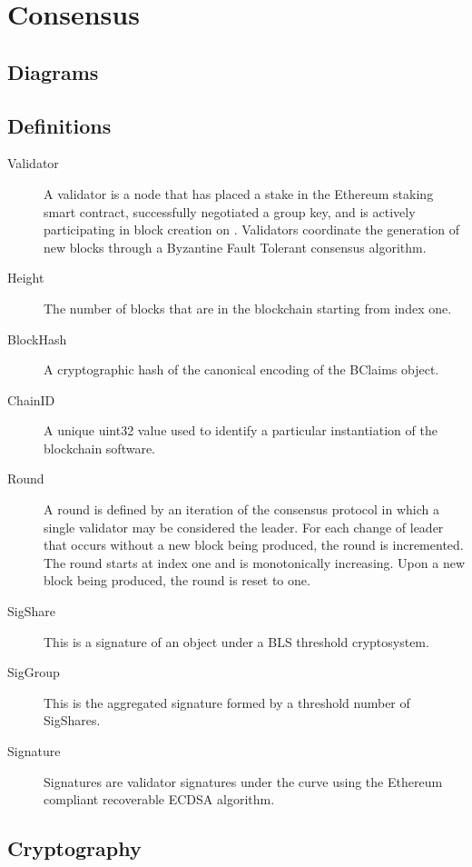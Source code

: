 \section{Consensus}

\subsection{Diagrams}



\subsection{Definitions}

\begin{description}
\item [Validator] A validator is a node that has placed a stake in the
    Ethereum staking smart contract, successfully negotiated a group key,
    and is actively participating in block creation on \LayerTwo{}.
    Validators coordinate the generation of new blocks through a
    Byzantine Fault Tolerant consensus algorithm.
\item [Height]
    The number of blocks that are in the blockchain starting from index one.
\item [BlockHash] A cryptographic hash of the canonical encoding
    of the BClaims object.
\item [ChainID] A unique uint32 value used to identify a particular
    instantiation of the \LayerTwo{} blockchain software.
\item [Round] A round is defined by an iteration of the consensus
    protocol in which a single validator may be considered the leader.
    For each change of leader that occurs without a new block being
    produced, the round is incremented.
    The round starts at index one and is monotonically increasing.
    Upon a new block being produced, the round is reset to one.
\item [SigShare] This is a signature of an object under a BLS threshold
    cryptosystem.
\item [SigGroup] This is the aggregated signature formed by a threshold
    number of SigShares.
\item [Signature] Signatures are validator signatures under the
    \secp{} curve using the Ethereum compliant recoverable ECDSA algorithm.
\end{description}


\subsection{Cryptography}

